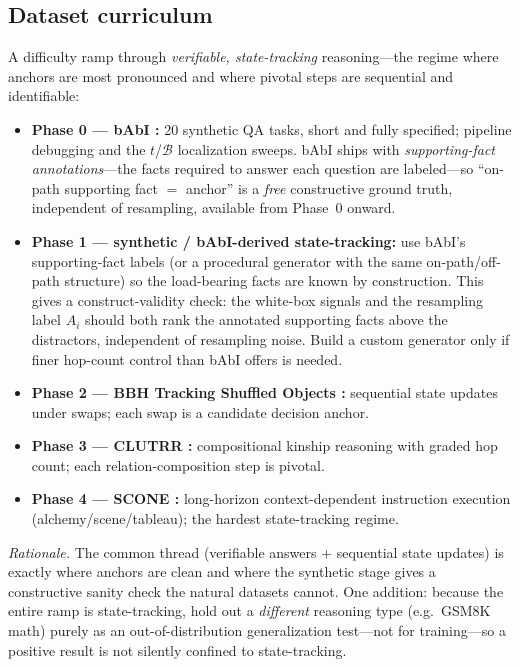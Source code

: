 \documentclass[11pt]{article}
\begin{document}
\subsection{Dataset curriculum}
\label{sec:curriculum}
A difficulty ramp through \emph{verifiable, state-tracking} reasoning---the regime where anchors are
most pronounced and where pivotal steps are sequential and identifiable:
\begin{itemize}[leftmargin=1.4em,itemsep=2pt]
\item \textbf{Phase 0 --- bAbI \cite{weston2015towards}:} 20 synthetic QA tasks, short and
fully specified; pipeline debugging and the $t$/$\mathcal B$ localization sweeps. bAbI ships with
\emph{supporting-fact annotations}---the facts required to answer each question are labeled---so
``on-path supporting fact $=$ anchor'' is a \emph{free} constructive ground truth, independent of
resampling, available from Phase~0 onward.
\item \textbf{Phase 1 --- synthetic / bAbI-derived state-tracking:} use bAbI's supporting-fact labels
(or a procedural generator with the same on-path/off-path structure) so the load-bearing facts are
known by construction. This gives a construct-validity check: the white-box signals and the resampling
label $A_i$ should both rank the annotated supporting facts above the distractors, independent of
resampling noise. Build a custom generator only if finer hop-count control than bAbI offers is needed.
\item \textbf{Phase 2 --- BBH Tracking Shuffled Objects \cite{suzgun2022challenging}:} sequential
state updates under swaps; each swap is a candidate decision anchor.
\item \textbf{Phase 3 --- CLUTRR \cite{sinha2019clutrr}:} compositional kinship reasoning with graded
hop count; each relation-composition step is pivotal.
\item \textbf{Phase 4 --- SCONE \cite{long2016simpler}:} long-horizon context-dependent instruction
execution (alchemy/scene/tableau); the hardest state-tracking regime.
\end{itemize}
\emph{Rationale.} The common thread (verifiable answers $+$ sequential
state updates) is exactly where anchors are clean and where the synthetic stage gives a constructive
sanity check the natural datasets cannot. One addition: because the entire ramp is state-tracking, hold
out a \emph{different} reasoning type (e.g.\ GSM8K math) purely as an out-of-distribution generalization
test---not for training---so a positive result is not silently confined to state-tracking.
\end{document}
